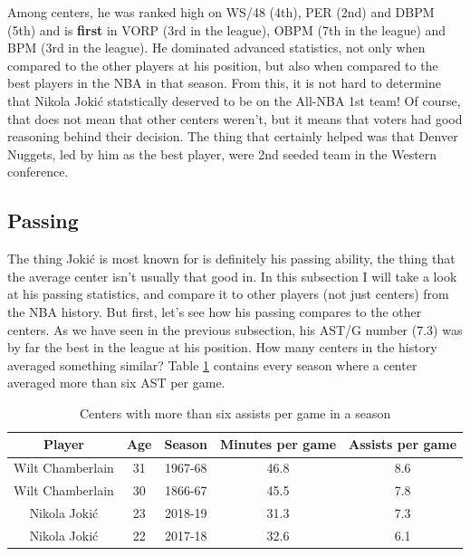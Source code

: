 \documentclass[a4paper]{article}
\begin{document}
Among centers, he was ranked high on WS/48 (4th), PER (2nd) and DBPM (5th) and is \textbf{first} in VORP (3rd in the league), OBPM (7th in the league) and BPM (3rd in the league). He dominated advanced statistics, not only when compared to the other players at his position, but also when compared to the best players in the NBA in that season. From this, it is not hard to determine that Nikola Joki\' c statstically deserved to be on the All-NBA 1st team! Of course, that does not mean that other centers weren't, but it means that voters had good reasoning behind their decision. The thing that certainly helped was that Denver Nuggets, led by him as the best player, were 2nd seeded team in the Western conference.

\subsection{Passing}
\label{subsec:jokic_passing}

The thing Joki\' c is most known for is definitely his passing ability, the thing that the average center isn't usually that good in. In this subsection I will take a look at his passing statistics, and compare it to other players (not just centers) from the NBA history. But first, let's see how his passing compares to the other centers. As we have seen in the previous subsection, his AST/G number (7.3) was by far the best in the league at his position. How many centers in the history averaged something similar? Table \ref{tab:centers_ast_g} contains every season where a center averaged more than six AST per game.

\begin{table}[h!]
\begin{center}
\begin{tabular}{|c|c|c|c|c|} \hline
\textbf{Player} & \textbf{Age} & \textbf{Season} & \textbf{Minutes per game} & \textbf{Assists per game} \\ \hline
Wilt Chamberlain & 31 & 1967-68 & 46.8 & 8.6 \\ \hline
Wilt Chamberlain & 30 & 1866-67 & 45.5 & 7.8\\ \hline
Nikola Jokić & 23 & 2018-19 & 31.3 & 7.3 \\ \hline
Nikola Jokić & 22 & 2017-18 & 32.6 & 6.1 \\ \hline
\end{tabular}
\caption{Centers with more than six assists per game in a season}
\label{tab:centers_ast_g}
\end{center}
\end{table}
\end{document}

